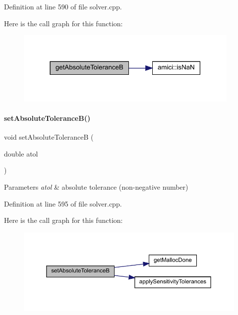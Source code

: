 Definition at line 590 of file solver.\+cpp.

Here is the call graph for this function\+:
\nopagebreak
\begin{figure}[H]
\begin{center}
\leavevmode
\includegraphics[width=307pt]{classamici_1_1_solver_ac495bd9ff960704197bc5e48ef9ee5de_cgraph}
\end{center}
\end{figure}
\mbox{\label{classamici_1_1_solver_a0d680ec1bec367b0708f664a760c13f1}} 
\paragraph{\texorpdfstring{setAbsoluteToleranceB()}{setAbsoluteToleranceB()}}
{\footnotesize\ttfamily void set\+Absolute\+ToleranceB (\begin{DoxyParamCaption}\item[{double}]{atol }\end{DoxyParamCaption})}


\begin{DoxyParams}{Parameters}
{\em atol} & absolute tolerance (non-\/negative number) \\
\hline
\end{DoxyParams}


Definition at line 595 of file solver.\+cpp.

Here is the call graph for this function\+:
\nopagebreak
\begin{figure}[H]
\begin{center}
\leavevmode
\includegraphics[width=350pt]{classamici_1_1_solver_a0d680ec1bec367b0708f664a760c13f1_cgraph}
\end{center}
\end{figure}
\mbox{\label{classamici_1_1_solver_a40124a6593fea7f5ddbf39385b021a9e}} 

